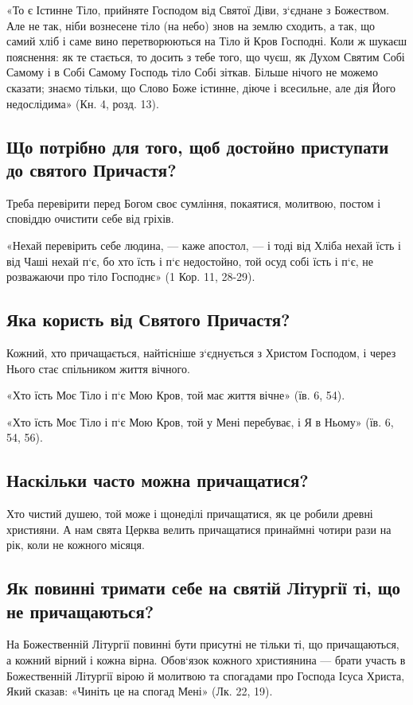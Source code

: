 \documentclass[main.tex]{subfiles}
\begin{document}
«То є Істинне Тіло, прийняте Господом від Святої Діви, з`єднане з Божеством. Але не так, ніби вознесене тіло (на небо) знов на землю сходить, а так, що самий хліб і саме вино перетворюються на Тіло й Кров Господні. Коли ж шукаєш пояснення: як те стається, то досить з тебе того, що чуєш, як Духом Святим Собі Самому і в Собі Самому Господь тіло Собі зіткав. Більше нічого не можемо сказати; знаємо тільки, що Слово Боже істинне, діюче і всесильне, але дія Його недослідима» (Кн. 4, розд. 13).

\subsection{Що потрібно для того, щоб достойно приступати до святого Причастя?}

Треба перевірити перед Богом своє сумління, покаятися, молитвою, постом і сповіддю очистити себе від гріхів.

«Нехай перевірить себе людина, — каже апостол, — і тоді від Хліба нехай їсть і від Чаші нехай п`є, бо хто їсть і п`є недостойно, той осуд собі їсть і п`є, не розважаючи про тіло Господнє» (1 Кор. 11, 28-29).

\subsection{Яка користь від Святого Причастя?}
Кожний, хто причащається, найтісніше з`єднується з Христом Господом, і через Нього стає спільником життя вічного.

«Хто їсть Моє Тіло і п`є Мою Кров, той має життя вічне» (їв. 6, 54).

«Хто їсть Моє Тіло і п`є Мою Кров, той у Мені перебуває, і Я в Ньому» (їв. 6, 54, 56).

\subsection{Наскільки часто можна причащатися?}

Хто чистий душею, той може і щонеділі причащатися, як це робили древні християни. А нам свята Церква велить причащатися принаймні чотири рази на рік, коли не кожного місяця.

\subsection{Як повинні тримати себе на святій Літургії ті, що не причащаються?}

На Божественній Літургії повинні бути присутні не тільки ті, що причащаються, а кожний вірний і кожна вірна. Обов`язок кожного християнина — брати участь в Божественній Літургії вірою й молитвою та спогадами про Господа Ісуса Христа, Який сказав: «Чиніть це на спогад Мені» (Лк. 22, 19).
\end{document}
